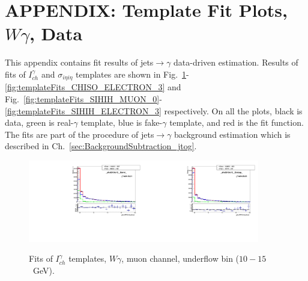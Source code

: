\section{APPENDIX: Template Fit Plots, $W\gamma$, Data}
\label{sec:TemplateFitPlots}

This appendix contains fit results of jets$\rightarrow \gamma$ data-driven estimation. Results of fits of $I_{ch}^{\gamma}$ and $\sigma_{i\eta i\eta}$ templates are shown in Fig.~\ref{fig:templateFits_CHISO_MUON_0}-\ref{fig:templateFits_CHISO_ELECTRON_3} and Fig.~\ref{fig:templateFits_SIHIH_MUON_0}-\ref{fig:templateFits_SIHIH_ELECTRON_3} respectively. On all the plots, black is data, green is real-$\gamma$ template, blue is fake-$\gamma$ template, and red is the fit function. The fits are part of the procedure of jets$\rightarrow\gamma$ background estimation which is described in Ch.~\ref{sec:BackgroundSubtraction_jtog}.

  

\begin{figure}[htb]
  \begin{center}
   \includegraphics[width=0.45\textwidth]{../figs/figs_v11/MUON_WGamma/TemplateFits/c_TEMPL_CHISO_UNblind__phoEt10to15__Barrel__RooFit.pdf}\includegraphics[width=0.45\textwidth]{../figs/figs_v11/MUON_WGamma/TemplateFits/c_TEMPL_CHISO_UNblind__phoEt10to15__Endcap__RooFit.pdf}\\
  \label{fig:templateFits_CHISO_MUON_0}
  \caption{Fits of $I_{ch}^{\gamma}$ templates, $W\gamma$, muon channel, underflow bin ($10-15$~GeV).}
  \end{center}
\end{figure}

